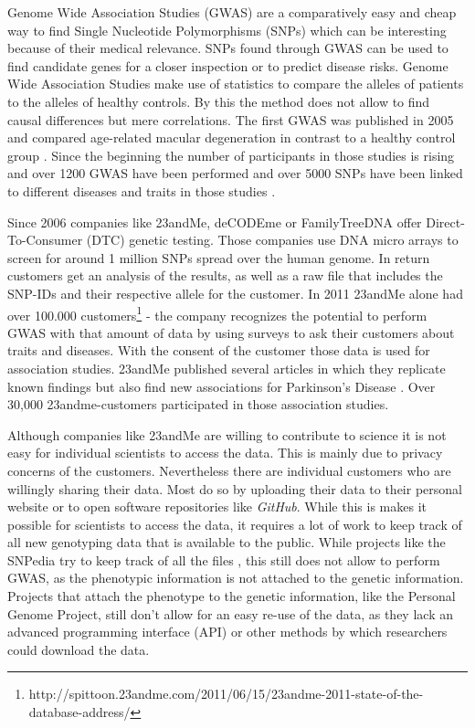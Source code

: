 \documentclass[10pt]{article}
\begin{document}
Genome Wide Association Studies (GWAS) are a comparatively easy and cheap way to find Single Nucleotide Polymorphisms (SNPs) which can be interesting because of their medical relevance. SNPs found through GWAS can be used to find candidate genes for a closer inspection or to predict disease risks. Genome Wide Association Studies make use of statistics to compare the alleles of patients to the alleles of healthy controls. By this the method does not allow to find causal differences but mere correlations. The first GWAS was published in 2005 and compared age-related macular degeneration in contrast to a healthy control group \cite{Klein2005}. Since the beginning the number of participants in those studies is rising and over 1200 GWAS have been performed \cite{Johnson2009} and over 5000 SNPs have been linked to different diseases and traits in those studies \cite{Hindorff2009}. %

Since 2006 companies like 23andMe, deCODEme or FamilyTreeDNA offer Direct-To-Consumer (DTC) genetic testing. Those companies use DNA micro arrays to screen for around 1 million SNPs spread over the human genome. In return customers get an analysis of the results, as well as a raw file that includes the SNP-IDs and their respective allele for the customer. In 2011 23andMe alone had over 100.000 customers\footnote{http://spittoon.23andme.com/2011/06/15/23andme-2011-state-of-the-database-address/} - the company recognizes the potential to perform GWAS with that amount of data by using surveys to ask their customers about traits and diseases. With the consent of the customer those data is used for association studies. 23andMe published several articles in which they replicate known findings but also find new associations for Parkinson's Disease \cite{Eriksson2010, Do2011}. Over 30,000 23andme-customers participated in those association studies.  

Although companies like 23andMe are willing to contribute to science it is not easy for individual scientists to access the data. This is mainly due to privacy concerns of the customers. Nevertheless there are individual customers who are willingly sharing their data. Most do so by uploading their data to their personal website or to open software repositories like \textit{GitHub}. While this is makes it possible for scientists to access the data, it requires a lot of work to keep track of all new genotyping data that is available to the public. While projects like the SNPedia try to keep track of all the files \cite{Cariaso2011}, this still does not allow to perform GWAS, as the phenotypic information is not attached to the genetic information. Projects that attach the phenotype to the genetic information, like the Personal Genome Project, still don't allow for an easy re-use of the data, as they lack an advanced programming interface (API) or other methods by which researchers could download the data.  
\end{document}
